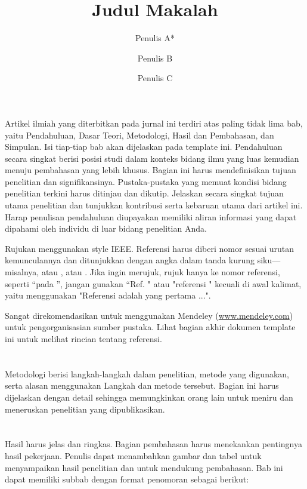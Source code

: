 \documentclass[eng]{JuLIET-class}
\title{Judul Makalah}
\author[1]{Penulis A*}
\author[2]{Penulis B}
\author[3]{Penulis C}
\affil[1]{Nama Departemen, Nama Afiliasi 1; penulis b@email.com}
\affil[2]{Nama Departemen, Nama Afiliasi 1; penulis b@email.com}
\affil[*]{Korespondensi: penulis a@email.com}
\begin{document}
	
	\maketitle
	\thispagestyle{fancy}
	
	\section{}
	Artikel ilmiah yang diterbitkan pada jurnal ini terdiri atas paling tidak lima bab, yaitu Pendahuluan, Dasar Teori, Metodologi, Hasil dan Pembahasan, dan Simpulan. Isi tiap-tiap bab akan dijelaskan pada template ini.
	Pendahuluan secara singkat berisi posisi studi dalam konteks bidang ilmu yang luas kemudian menuju pembahasan yang lebih khusus. Bagian ini harus mendefinisikan tujuan penelitian dan signifikansinya. Pustaka-pustaka yang memuat kondisi bidang penelitian terkini harus ditinjau dan dikutip. Jelaskan secara singkat tujuan utama penelitian dan tunjukkan kontribusi serta kebaruan utama dari artikel ini. Harap penulisan pendahuluan diupayakan memiliki aliran informasi yang dapat dipahami oleh individu di luar bidang penelitian Anda.
	
	Rujukan menggunakan style IEEE. Referensi harus diberi nomor sesuai urutan kemunculannya dan ditunjukkan dengan angka dalam tanda kurung siku—misalnya, \cite{NACA460} atau \cite{WangEtAl2015}, atau \cite{ArslanHansen1996,Indura2010,Krause2014}. Jika ingin merujuk, rujuk hanya ke nomor referensi, seperti “pada \cite{Mitchell2001}”, jangan gunakan “Ref. \cite{Mitchell2001}" atau "referensi \cite{Mitchell2001}" kecuali di awal kalimat, yaitu menggunakan "Referensi \cite{Mitchell2001} adalah yang pertama ...". 
	
	Sangat direkomendasikan untuk menggunakan Mendeley (\url{www.mendeley.com}) untuk pengorganisasian sumber pustaka. Lihat bagian akhir dokumen template ini untuk melihat rincian tentang referensi.
	
	
	\section{}    
	Metodologi berisi langkah-langkah dalam penelitian, metode yang digunakan, serta alasan menggunakan Langkah dan metode tersebut. Bagian ini  harus dijelaskan dengan detail sehingga memungkinkan orang lain untuk meniru dan meneruskan penelitian yang dipublikasikan.	
	
	
	\section{}
	Hasil harus jelas dan ringkas. Bagian pembahasan harus menekankan pentingnya hasil pekerjaan. Penulis dapat menambahkan gambar dan tabel untuk menyampaikan hasil penelitian dan untuk mendukung pembahasan. Bab ini dapat memiliki subbab dengan format penomoran sebagai berikut:
	
\end{document}
